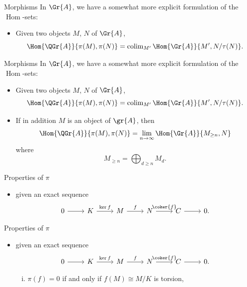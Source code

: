 \documentclass{beamer}
\theoremstyle{definition}
\begin{document}
\begin{frame}{Morphisms}
  In $\Gr{A}$, we have a somewhat more explicit formulation of the $\operatorname{Hom}$-sets:
  \begin{itemize}
    \item
      Given two objects $M$, $N$ of $\Gr{A}$, 
      $$\Hom{\QGr{A}}{\pi(M), \pi(N)} = \operatorname{colim}_{M^\prime}\Hom{\Gr{A}}{M^\prime, N/\tau(N)}.$$
  \end{itemize}
\end{frame}

\begin{frame}{Morphisms}
  In $\Gr{A}$, we have a somewhat more explicit formulation of the $\operatorname{Hom}$-sets:
  \begin{itemize}
    \item
      Given two objects $M$, $N$ of $\Gr{A}$, 
      $$\Hom{\QGr{A}}{\pi(M), \pi(N)} = \operatorname{colim}_{M^\prime}\Hom{\Gr{A}}{M^\prime, N/\tau(N)}.$$
    \item
      If in addition $M$ is an object of $\gr{A}$, then 
      $$\Hom{\QGr{A}}{\pi(M), \pi(N)} = \lim_{n \rightarrow \infty} \Hom{\Gr{A}}{M_{\geq n}, N}$$
      where 
      $$M_{\geq n} = \bigoplus_{d \geq n} M_d.$$
  \end{itemize}
\end{frame}

\begin{frame}[fragile]{Properties of $\pi$}
  \begin{itemize}
  \item
    given an exact sequence
    $$\begin{tikzcd}
      0 \arrow{r} & K \arrow{r}{\ker{f}} & M \arrow{r}{f} & N \arrow{r}{\coker{f}} & C \arrow{r} & 0.
    \end{tikzcd}$$
  \end{itemize}
\end{frame}

\begin{frame}[fragile]{Properties of $\pi$}
  \begin{itemize}
  \item
    given an exact sequence
    $$\begin{tikzcd}
      0 \arrow{r} & K \arrow{r}{\ker{f}} & M \arrow{r}{f} & N \arrow{r}{\coker{f}} & C \arrow{r} & 0.
    \end{tikzcd}$$
    \begin{enumerate}[(i)]
    \item
      $\pi(f) = 0$ if and only if $f(M) \cong M/K$ is torsion,
    \end{enumerate}
  \end{itemize}
\end{frame}
\end{document}
